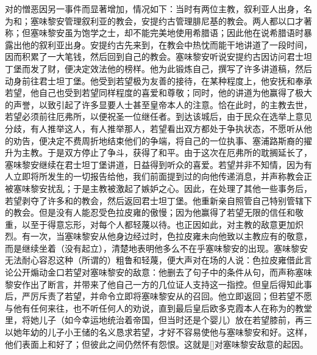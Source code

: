 对的憎恶因另一事件而显著增加，情况如下：当时有两位主教，叙利亚人出身，名为和；塞味黎安管理叙利亚的教会，安提约古管理腓尼基的教会。两人都以口才著称；但塞味黎安虽为饱学之士，却不能完美地使用希腊语；因此他在说希腊语时暴露出他的叙利亚出身。安提约古先来到，在教会中热忱而能干地讲道了一段时间，因而积累了一大笔钱，然后回到自己的教会。塞味黎安听说安提约古因访问君士坦丁堡而发了财，便决定效法他的榜样。他为此锻炼自己，撰写了许多讲道稿，然后动身前往君士坦丁堡。他受到若望极为友善的接待，在某种程度上，他安抚和奉承若望，他自己也受到若望同样程度的喜爱和尊敬；同时，他的讲道为他赢得了极大的声誉，以致引起了许多显要人士甚至皇帝本人的注意。恰在此时，的主教去世，若望必须前往厄弗所，以便祝圣一位继任者。到达该城后，由于民众在选举上意见分歧，有人推举这人，有人推举那人，若望看出双方都处于争执状态，不愿听从他的劝告，便决定不费周折地结束他们的争端，将自己的一位执事、塞浦路斯裔的擢升为主教。于是双方停止了争斗，获得了和平。由于这次在厄弗所的耽搁延长了，塞味黎安继续在君士坦丁堡讲道，日益得到听众的喜爱。若望并非不知情，因为有人立即将所发生的一切报告给他，我们前面提到过的向他传递消息，并声称教会正被塞味黎安扰乱；于是主教被激起了嫉妒之心。因此，在处理了其他一些事务后，若望剥夺了许多和的教会，然后返回君士坦丁堡。他重新亲自照管自己特别管辖下的教会。但是没有人能忍受色拉皮雍的傲慢；因为他赢得了若望无限的信任和敬重，以至于得意忘形，对每个人都轻蔑以待。也正因如此，对主教的敌意更加炽烈。有一次，当塞味黎安从他身边经过时，色拉皮雍未向他致以主教应有的敬意，而是继续坐着（没有起立），清楚地表明他多么不在乎塞味黎安的出现。塞味黎安无法耐心容忍这种（所谓的）粗鲁和轻蔑，便大声对在场的人说：色拉皮雍借此言论公开煽动金口若望对塞味黎安的敌意：他删去了句子中的条件从句，而声称塞味黎安作出了断言，并带来了他自己一方的几位证人支持这一指控。但皇后得知此事后，严厉斥责了若望，并命令立即将塞味黎安从的召回。他立即返回；但若望不愿与他有任何来往，也不听任何人的劝说，直到最后皇后欧多克霞本人在称为的教堂里，将她儿子（如今幸运地统治着帝国，但当时还是个婴儿）放在若望膝前，再三以她年幼的儿子小王储的名义恳求若望，才好不容易使他与塞味黎安和好。这样，他们表面上和好了；但彼此之间仍然怀有怨恨。这就是[]对塞味黎安敌意的起因。\par


